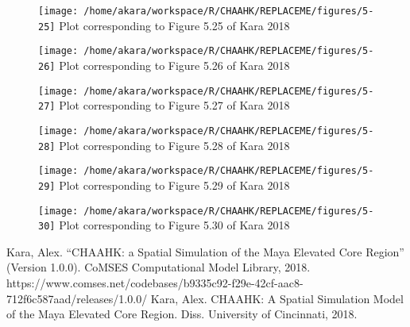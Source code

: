 \documentclass{article}
\begin{document}
\begin{figure}[H]
	\texttt{[image: /home/akara/workspace/R/CHAAHK/REPLACEME/figures/5-25]}
	Plot corresponding to Figure 5.25 of Kara 2018
	\label{fig:5-25}
\end{figure}
\begin{figure}[H]
	\texttt{[image: /home/akara/workspace/R/CHAAHK/REPLACEME/figures/5-26]}
	Plot corresponding to Figure 5.26 of Kara 2018
	\label{fig:5-26}
\end{figure}
\begin{figure}[H]
	\texttt{[image: /home/akara/workspace/R/CHAAHK/REPLACEME/figures/5-27]}
	Plot corresponding to Figure 5.27 of Kara 2018
	\label{fig:5-27}
\end{figure}
\begin{figure}[H]
	\texttt{[image: /home/akara/workspace/R/CHAAHK/REPLACEME/figures/5-28]}
	Plot corresponding to Figure 5.28 of Kara 2018
	\label{fig:5-28}
\end{figure}
\begin{figure}[H]
	\texttt{[image: /home/akara/workspace/R/CHAAHK/REPLACEME/figures/5-29]}
	Plot corresponding to Figure 5.29 of Kara 2018
	\label{fig:5-29}
\end{figure}
\begin{figure}[H]
	\texttt{[image: /home/akara/workspace/R/CHAAHK/REPLACEME/figures/5-30]}
	Plot corresponding to Figure 5.30 of Kara 2018
	\label{fig:5-30}
\end{figure}
\begin{thebibliography}{9}
	Kara, Alex. ``CHAAHK: a Spatial Simulation of the Maya Elevated Core Region'' (Version 1.0.0). CoMSES Computational Model Library, 2018. https://www.comses.net/codebases/b9335c92-f29e-42cf-aac8-712f6c587aad/releases/1.0.0/
	Kara, Alex. CHAAHK: A Spatial Simulation Model of the Maya Elevated Core Region. Diss. University of Cincinnati, 2018.
\end{thebibliography}
\end{document}
